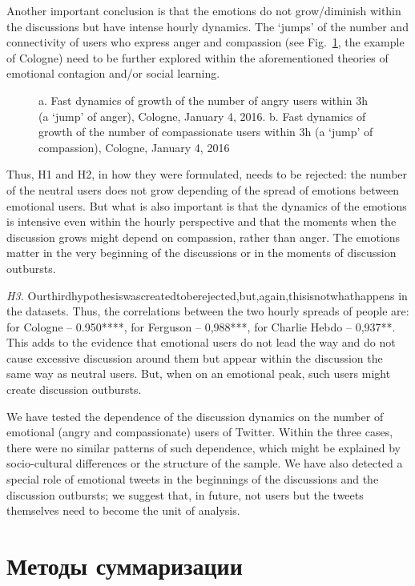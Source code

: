 Another important conclusion is that the emotions do not grow/diminish within the discussions but have intense hourly dynamics. The ‘jumps’ of the number and connectivity of users who express anger and compassion (see Fig.~\cref{fig:fastDynamcs}, the example of Cologne) need to be further explored within the aforementioned theories of emotional contagion and/or social learning.

\begin{figure}[ht]
	\caption{a. Fast dynamics of growth of the number of angry users within 3h (a ‘jump’ of anger), Cologne, January 4, 2016. b. Fast dynamics of growth of the number of compassionate users within 3h (a ‘jump’ of compassion), Cologne, January 4, 2016
	}\label{fig:fastDynamcs}
\end{figure} 

Thus, H1 and H2, in how they were formulated, needs to be rejected: the number of the neutral users does not grow depending of the spread of emotions between emotional users. But what is also important is that the dynamics of the emotions is intensive even within the hourly perspective and that the moments when the discussion grows might depend on compassion, rather than anger. The emotions matter in the very beginning of the discussions or in the moments of discussion outbursts.

\textit{H3.} Ourthirdhypothesiswascreatedtoberejected,but,again,thisisnotwhathappens in the datasets. Thus, the correlations between the two hourly spreads of people are: for Cologne -- 0.950****, for Ferguson -- 0,988***, for Charlie Hebdo -- 0,937**. This adds to the evidence that emotional users do not lead the way and do not cause excessive discussion around them but appear within the discussion the same way as neutral users. But, when on an emotional peak, such users might create discussion outbursts.

We have tested the dependence of the discussion dynamics on the number of emotional (angry and compassionate) users of Twitter. Within the three cases, there were no similar patterns of such dependence, which might be explained by socio-cultural differences or the structure of the sample. We have also detected a special role of emotional tweets in the beginnings of the discussions and the discussion outbursts; we suggest that, in future, not users but the tweets themselves need to become the unit of analysis.

\section{Методы суммаризации}\label{sec:ch5/sect4}

\FloatBarrier

